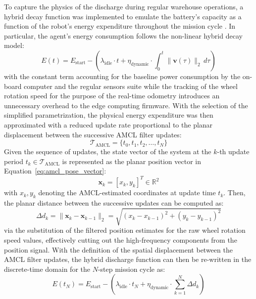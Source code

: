 To capture the physics of the discharge during regular warehouse operations, a hybrid decay function was implemented to emulate the battery's capacity as a function of the robot's energy expenditure throughout the mission cycle \cite{energy2026constrained, realtime2026estimation}. In particular, the agent's energy consumption follows the non-linear hybrid decay model:
\begin{equation}
E(t) = E_{\text{start}} - \left( \lambda_{\text{idle}} \cdot t + \eta_{\text{dynamic}} \cdot \int_{0}^{t} \| \mathbf{v}(\tau) \|_2 \, d\tau \right) \label{eq:hybrid_decay_continuous}
\end{equation}
with the constant term accounting for the baseline power consumption by the on-board computer and the regular sensors suite while the tracking of the wheel rotation speed for the purpose of the real-time odometry introduces an unnecessary overhead to the edge computing firmware. With the selection of the simplified parametrization, the physical energy expenditure was then approximated with a reduced update rate proportional to the planar displacement between the successive AMCL filter updates:
\begin{equation}
\mathcal{T}_{\text{AMCL}} = \{ t_0, t_1, t_2, \dots, t_N \} \label{eq:amcl_time_set}
\end{equation}
Given the sequence of updates, the state vector of the system at the $k$-th update period $t_k \in \mathcal{T}_{\text{AMCL}}$ is represented as the planar position vector in Equation~\eqref{eq:amcl_pose_vector}:
\begin{equation}
\mathbf{x}_k = [x_k, y_k]^T \in \mathbb{R}^2 \label{eq:amcl_pose_vector}
\end{equation}
with $x_k, y_k$ denoting the AMCL-estimated coordinates at update time $t_k$. Then, the planar distance between the successive updates can be computed as:
\begin{equation}
\Delta d_k = \| \mathbf{x}_k - \mathbf{x}_{k-1} \|_2 = \sqrt{(x_k - x_{k-1})^2 + (y_k - y_{k-1})^2} \label{eq:euclidean_displacement}
\end{equation}
via the substitution of the filtered position estimates for the raw wheel rotation speed values, effectively cutting out the high-frequency components from the position signal. With the definition of the spatial displacement between the AMCL filter updates, the hybrid discharge function can then be re-written in the discrete-time domain for the $N$-step mission cycle as:
\begin{equation}
E(t_N) = E_{\text{start}} - \left( \lambda_{\text{idle}} \cdot t_N + \eta_{\text{dynamic}} \cdot \sum_{k=1}^{N} \Delta d_k \right) \label{eq:hybrid_decay_discrete}
\end{equation}


